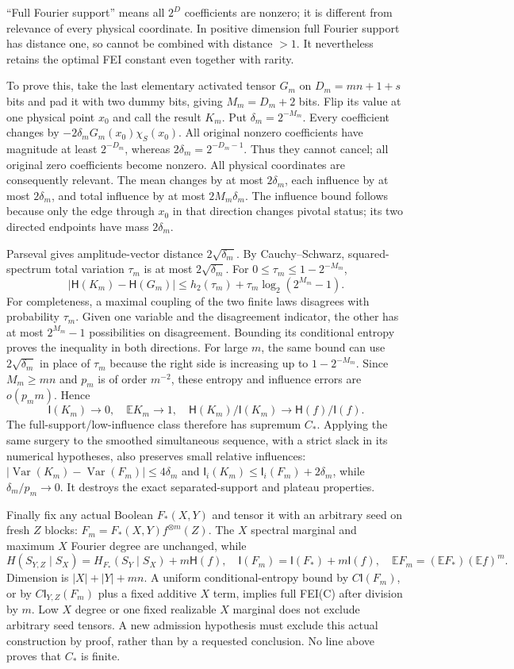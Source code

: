 \documentclass[11pt]{article}
\newcommand{\I}{\mathsf I}\newcommand{\HH}{\mathsf H}
\newcommand{\Var}{\operatorname{Var}}
\newcommand{\E}{\mathbb E}
\begin{document}
``Full Fourier support'' means all $2^D$ coefficients are nonzero; it is
different from relevance of every physical coordinate. In positive dimension
full Fourier support has distance one, so cannot be combined with distance $>1$.
It nevertheless retains the optimal FEI constant even together with rarity.

To prove this, take the last elementary activated tensor $G_m$ on $D_m=mn+1+s$
bits and pad it with two dummy bits, giving $M_m=D_m+2$ bits.
Flip its value at one physical point $x_0$ and call the result $K_m$.
Put $\delta_m=2^{-M_m}$. Every coefficient changes by
$-2\delta_m G_m(x_0)\chi_S(x_0)$.
All original nonzero coefficients have magnitude at least $2^{-D_m}$,
whereas $2\delta_m=2^{-D_m-1}$. Thus they cannot cancel; all original zero
coefficients become nonzero. All physical coordinates are consequently relevant.
The mean changes by at most $2\delta_m$, each influence by at most
$2\delta_m$, and total influence by at most $2M_m\delta_m$.
The influence bound follows because only the edge through $x_0$ in that
direction changes pivotal status; its two directed endpoints have mass
$2\delta_m$.

Parseval gives amplitude-vector distance $2\sqrt{\delta_m}$.
By Cauchy--Schwarz, squared-spectrum total variation $\tau_m$ is at most
$2\sqrt{\delta_m}$. For $0\le\tau_m\le1-2^{-M_m}$,
\[
 |\HH(K_m)-\HH(G_m)|\le h_2(\tau_m)+\tau_m\log_2(2^{M_m}-1).
\]
For completeness, a maximal coupling of the two finite laws disagrees with
probability $\tau_m$. Given one variable and the disagreement indicator,
the other has at most $2^{M_m}-1$ possibilities on disagreement. Bounding its
conditional entropy proves the inequality in both directions.
For large $m$, the same bound can use $2\sqrt{\delta_m}$ in place of $\tau_m$
because the right side is increasing up to $1-2^{-M_m}$.
Since $M_m\ge mn$ and $p_m$ is of order $m^{-2}$, these entropy and influence
errors are $o(p_m m)$. Hence
\[
 \I(K_m)\to0,\quad\E K_m\to1,\quad
 \HH(K_m)/\I(K_m)\to\HH(f)/\I(f).
\]
The full-support/low-influence class therefore has supremum $C_*$.
Applying the same surgery to the smoothed simultaneous sequence, with a strict
slack in its numerical hypotheses, also preserves small relative influences:
$|\Var(K_m)-\Var(F_m)|\le4\delta_m$ and
$\I_i(K_m)\le\I_i(F_m)+2\delta_m$, while $\delta_m/p_m\to0$.
It destroys the exact separated-support and plateau properties.

Finally fix any actual Boolean $F_*(X,Y)$ and tensor it with an arbitrary seed
on fresh $Z$ blocks: $F_m=F_*(X,Y)f^{\otimes m}(Z)$.
The $X$ spectral marginal and maximum $X$ Fourier degree are unchanged, while
\[
 H(S_{Y,Z}\mid S_X)=H_{F_*}(S_Y\mid S_X)+m\HH(f),\quad
 \I(F_m)=\I(F_*)+m\I(f),\quad
 \E F_m=(\E F_*)(\E f)^m.
\]
Dimension is $|X|+|Y|+mn$. A uniform conditional-entropy bound by $C\I(F_m)$,
or by $C\I_{Y,Z}(F_m)$ plus a fixed additive $X$ term, implies full FEI(C)
after division by $m$. Low $X$ degree or one fixed realizable $X$ marginal
does not exclude arbitrary seed tensors. A new admission hypothesis must exclude
this actual construction by proof, rather than by a requested conclusion.
No line above proves that $C_*$ is finite.
\end{document}
